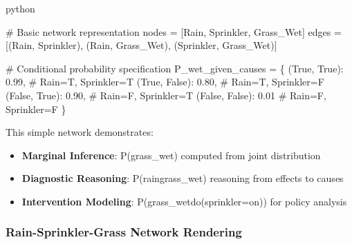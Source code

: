 \documentclass[
  11pt,
  letterpaper,
]{book}
\newenvironment{Shaded}{\begin{snugshade}}{\end{snugshade}}
\newcommand{\CommentTok}[1]{\textcolor[rgb]{0.37,0.37,0.37}{#1}}
\newcommand{\FloatTok}[1]{\textcolor[rgb]{0.68,0.00,0.00}{#1}}
\newcommand{\NormalTok}[1]{\textcolor[rgb]{0.00,0.23,0.31}{#1}}
\newcommand{\OperatorTok}[1]{\textcolor[rgb]{0.37,0.37,0.37}{#1}}
\newcommand{\StringTok}[1]{\textcolor[rgb]{0.13,0.47,0.30}{#1}}
\newcommand{\VariableTok}[1]{\textcolor[rgb]{0.07,0.07,0.07}{#1}}
\providecommand{\tightlist}{%
  \setlength{\itemsep}{0pt}\setlength{\parskip}{0pt}}
\begin{document}
python

\begin{Shaded}
\begin{Highlighting}[]
\CommentTok{\# Basic network representation}
\NormalTok{nodes }\OperatorTok{=}\NormalTok{ [}\StringTok{\textquotesingle{}Rain\textquotesingle{}}\NormalTok{, }\StringTok{\textquotesingle{}Sprinkler\textquotesingle{}}\NormalTok{, }\StringTok{\textquotesingle{}Grass\_Wet\textquotesingle{}}\NormalTok{]}
\NormalTok{edges }\OperatorTok{=}\NormalTok{ [(}\StringTok{\textquotesingle{}Rain\textquotesingle{}}\NormalTok{, }\StringTok{\textquotesingle{}Sprinkler\textquotesingle{}}\NormalTok{), (}\StringTok{\textquotesingle{}Rain\textquotesingle{}}\NormalTok{, }\StringTok{\textquotesingle{}Grass\_Wet\textquotesingle{}}\NormalTok{), (}\StringTok{\textquotesingle{}Sprinkler\textquotesingle{}}\NormalTok{, }\StringTok{\textquotesingle{}Grass\_Wet\textquotesingle{}}\NormalTok{)]}

\CommentTok{\# Conditional probability specification}
\NormalTok{P\_wet\_given\_causes }\OperatorTok{=}\NormalTok{ \{}
\NormalTok{    (}\VariableTok{True}\NormalTok{, }\VariableTok{True}\NormalTok{): }\FloatTok{0.99}\NormalTok{,    }\CommentTok{\# Rain=T, Sprinkler=T}
\NormalTok{    (}\VariableTok{True}\NormalTok{, }\VariableTok{False}\NormalTok{): }\FloatTok{0.80}\NormalTok{,   }\CommentTok{\# Rain=T, Sprinkler=F  }
\NormalTok{    (}\VariableTok{False}\NormalTok{, }\VariableTok{True}\NormalTok{): }\FloatTok{0.90}\NormalTok{,   }\CommentTok{\# Rain=F, Sprinkler=T}
\NormalTok{    (}\VariableTok{False}\NormalTok{, }\VariableTok{False}\NormalTok{): }\FloatTok{0.01}   \CommentTok{\# Rain=F, Sprinkler=F}
\NormalTok{\}}
\end{Highlighting}
\end{Shaded}

This simple network demonstrates:

\begin{itemize}
\tightlist
\item
  \textbf{Marginal Inference}: P(grass\_wet) computed from joint
  distribution
\item
  \textbf{Diagnostic Reasoning}: P(rain\textbar grass\_wet) reasoning
  from effects to causes
\item
  \textbf{Intervention Modeling}: P(grass\_wet\textbar do(sprinkler=on))
  for policy analysis
\end{itemize}

\subsubsection*{Rain-Sprinkler-Grass Network
Rendering}\label{rain-sprinkler-grass-network-rendering-1}
\end{document}
